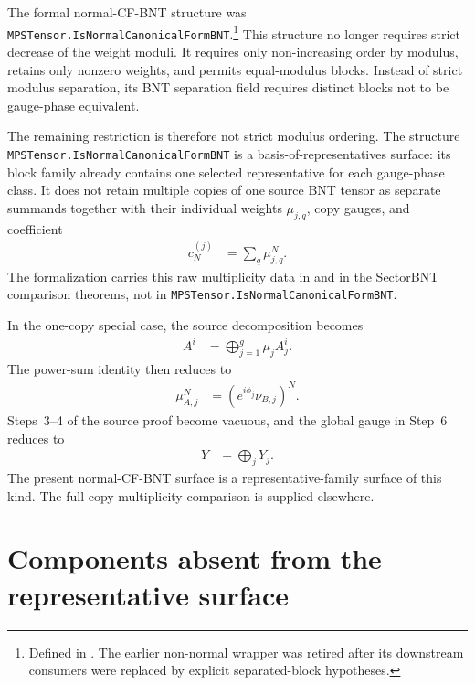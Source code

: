 \documentclass{article}
\begin{document}
The formal normal-CF-BNT structure was
\texttt{MPSTensor.IsNormalCanonicalFormBNT}.\footnote{Defined in
. The earlier non-normal wrapper was
retired after its downstream consumers were replaced by explicit
separated-block hypotheses.} This structure no longer requires strict
decrease of the weight moduli. It requires only non-increasing order by
modulus, retains only nonzero weights, and permits equal-modulus blocks.
Instead of strict modulus separation, its BNT separation field requires
distinct blocks not to be gauge-phase equivalent.

The remaining restriction is therefore not strict modulus ordering.
The structure \texttt{MPSTensor.IsNormalCanonicalFormBNT} is a
basis-of-representatives surface: its block family already contains one
selected representative for each gauge-phase class. It does not retain
multiple copies of one source BNT tensor as separate summands together with
their individual weights $\mu_{j,q}$, copy gauges, and coefficient
\begin{align}
    c_N^{(j)}
        &=\sum_q\mu_{j,q}^N.
    \label{eq:cpsv16_ft_one_copy_scope_restriction_sector_copy_coefficient}
\end{align}
The formalization carries this raw multiplicity data in
 and in the SectorBNT comparison theorems, not in
\texttt{MPSTensor.IsNormalCanonicalFormBNT}.

In the one-copy special case, the source decomposition becomes
\begin{align}
    A^i
        &=\bigoplus_{j=1}^{g}\mu_jA_j^i.
    \label{eq:cpsv16_ft_one_copy_scope_restriction_one_copy_decomposition}
\end{align}
The power-sum identity then reduces to
\begin{align}
    \mu_{A,j}^N
        &=(e^{i\phi_j}\nu_{B,j})^N.
    \label{eq:cpsv16_ft_one_copy_scope_restriction_one_copy_power_identity}
\end{align}
Steps~3--4 of the source proof become vacuous, and the global gauge in Step~6
reduces to
\begin{align}
    Y
        &=\bigoplus_jY_j.
    \label{eq:cpsv16_ft_one_copy_scope_restriction_one_copy_global_gauge}
\end{align}
The present normal-CF-BNT surface is a representative-family surface of this
kind. The full copy-multiplicity comparison is supplied elsewhere.

\section{Components absent from the representative surface}
\end{document}

